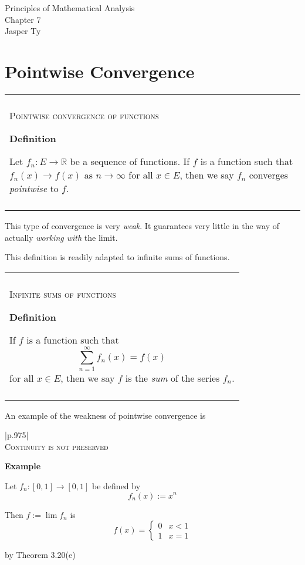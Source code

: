 \documentclass{article}
\newenvironment{myboxed}{\bigskip\noindent\begin{tabular}{|p{.975\textwidth}|}\hline \\}{\\\\\hline\end{tabular}\bigskip}
\newenvironment{mytitle}{\noindent\large\begin{flushright}}{\end{flushright}\normalsize}
\begin{document}
\begin{mytitle}
    Principles of Mathematical Analysis \\
    Chapter 7 \\
    \normalsize Jasper Ty
\end{mytitle}

\section{Pointwise Convergence}

\begin{myboxed}
    \textsc{Pointwise convergence of functions}

    \textbf{Definition}

    Let $f_n: E \rightarrow \mathbb{R}$ be a sequence of functions. If $f$ is a function such that $f_n(x) \to f(x)$ as $n \to \infty$ for all $x \in E$, then we say $f_n$ converges \textit{pointwise} to $f$.
\end{myboxed}

This type of convergence is very \textit{weak}. It guarantees very little in the way of actually \textit{working with} the limit.

This definition is readily adapted to infinite sums of functions.

\begin{myboxed}
    \textsc{Infinite sums of functions}

    \textbf{Definition}

    If $f$ is a function such that 
    \[\sum_{n=1}^\infty f_n(x) = f(x)\] 
    for all $x \in E$, then we say $f$ is the \textit{sum} of the series $f_n$.
\end{myboxed}

An example of the weakness of pointwise convergence is

\begin{myboxed}
    \textsc{Continuity is not preserved}

    \textbf{Example} 

    Let $f_n: [0, 1] \rightarrow [0, 1]$ be defined by
    \[f_n(x) := x^n\]

    Then $f := \lim f_n$ is 
    \[f(x) = \begin{cases}
        0 & x < 1 \\
        1 & x = 1
    \end{cases}\]

    by Theorem 3.20(e)
\end{myboxed}
\end{document}
